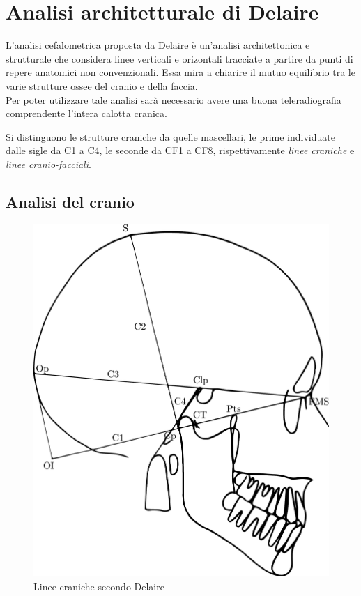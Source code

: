 \chapter{Analisi architetturale di Delaire}
\nocite{Delaire1981,Cudia1991}

L'analisi cefalometrica proposta da Delaire è un'analisi architettonica e strutturale che considera linee verticali e orizontali tracciate a partire da punti di repere anatomici non convenzionali. Essa mira a chiarire il mutuo equilibrio tra le varie strutture ossee del cranio e della faccia.\\
Per poter utilizzare tale analisi sarà necessario avere una buona teleradiografia comprendente l'intera calotta cranica.

Si distinguono le strutture craniche da quelle mascellari, le prime individuate dalle sigle da C1 a C4, le seconde da CF1 a CF8, rispettivamente \emph{linee craniche} e \emph{linee cranio-facciali}.

\section{Analisi del cranio}

\begin{figure}[!ht]
\centering
\includegraphics[width=.5\textwidth]{./images/delaire_craniali.pdf}
\caption{Linee craniche secondo Delaire}
\label{fig:delaire_craniche}
\end{figure}

